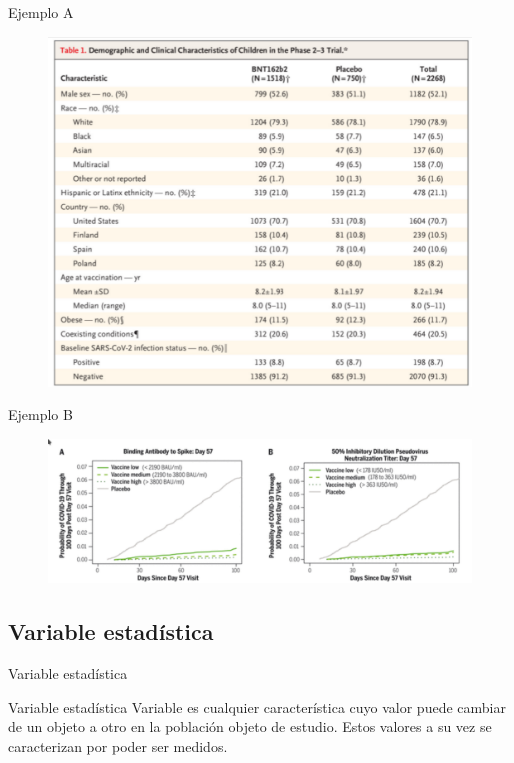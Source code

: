 \documentclass[11pt]{beamer}
\begin{document}
    \begin{frame}
      \begin{block}{Ejemplo A}
        \begin{figure}
            \centering
            \includegraphics[width=0.7\linewidth]{images/Lecture_1a}
            \label{fig:lecture1a}
        \end{figure}
      \end{block}
    \end{frame}
    \begin{frame}
      \begin{block}{Ejemplo B}
        \begin{figure}
            \centering
            \includegraphics[width=1\linewidth]{images/Lecture_1b}
            \label{fig:lecture1b}
        \end{figure}
      \end{block}
    \end{frame}

    \subsection{Variable estadística}
    \begin{frame}{Variable estadística}
      \begin{block}{Variable estadística}
         Variable es cualquier característica cuyo valor puede cambiar de un objeto a otro en la población objeto de estudio. Estos valores a su vez se caracterizan por poder ser medidos.
      \end{block}

    \end{frame}
\end{document}
